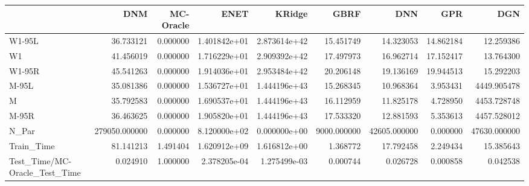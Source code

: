 \begin{tabular}{lrrrrrrrr}
\toprule
{} &            DNM &  MC-Oracle &          ENET &        KRidge &         GBRF &           DNN &        GPR &           DGN \\
\midrule
W1-95L                        &      36.733121 &   0.000000 &  1.401842e+01 &  2.873614e+42 &    15.451749 &     14.323053 &  14.862184 &     12.259386 \\
W1                            &      41.456019 &   0.000000 &  1.716229e+01 &  2.909392e+42 &    17.497973 &     16.962714 &  17.152417 &     13.764300 \\
W1-95R                        &      45.541263 &   0.000000 &  1.914036e+01 &  2.953484e+42 &    20.206148 &     19.136169 &  19.944513 &     15.292203 \\
M-95L                         &      35.081386 &   0.000000 &  1.536727e+01 &  1.444196e+43 &    15.268345 &     10.968364 &   3.953431 &   4449.905478 \\
M                             &      35.792583 &   0.000000 &  1.690537e+01 &  1.444196e+43 &    16.112959 &     11.825178 &   4.728950 &   4453.728748 \\
M-95R                         &      36.463625 &   0.000000 &  1.905820e+01 &  1.444196e+43 &    17.533320 &     12.881593 &   5.353613 &   4457.528012 \\
N\_Par                         &  279050.000000 &   0.000000 &  8.120000e+02 &  0.000000e+00 &  9000.000000 &  42605.000000 &   0.000000 &  47630.000000 \\
Train\_Time                    &      81.141213 &   1.491404 &  1.620912e+09 &  1.616812e+00 &     1.368772 &     17.792458 &   2.249434 &     15.385643 \\
Test\_Time/MC-Oracle\_Test\_Time &       0.024910 &   1.000000 &  2.378205e-04 &  1.275499e-03 &     0.000744 &      0.026728 &   0.000858 &      0.042538 \\
\bottomrule
\end{tabular}
